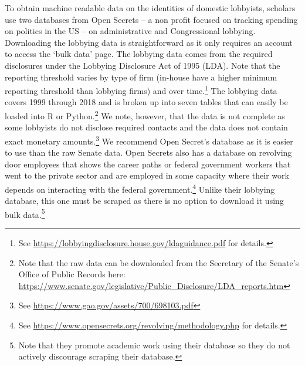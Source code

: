 \documentclass[12pt,notitlepage]{article}
\newcounter{cor}
\begin{document}
To obtain machine readable data on the identities of domestic lobbyists,
scholars use two databases from Open Secrets -- a non profit focused on
tracking spending on politics in the US -- on administrative and
Congressional lobbying. Downloading the lobbying data is straightforward
as it only requires an account to access the `bulk data' page. The
lobbying data comes from the required disclosures under the Lobbying
Disclosure Act of 1995 (LDA). Note that the reporting threshold varies
by type of firm (in-house have a higher minimum reporting threshold than
lobbying firms) and over time.\footnote{See
  \url{https://lobbyingdisclosure.house.gov/ldaguidance.pdf} for
  details.} The lobbying data covers 1999 through 2018 and is broken up
into seven tables that can easily be loaded into R or Python.\footnote{Note
  that the raw data can be downloaded from the Secretary of the Senate's
  Office of Public Records here:
  \url{https://www.senate.gov/legislative/Public_Disclosure/LDA_reports.htm}}
We note, however, that the data is not complete as some lobbyists do not
disclose required contacts and the data does not contain exact monetary
amounts.\footnote{See \url{https://www.gao.gov/assets/700/698103.pdf}}
We recommend Open Secret's database as it is easier to use than the raw
Senate data. Open Secrets also has a database on revolving door
employees that shows the career paths or federal government workers that
went to the private sector and are employed in some capacity where their
work depends on interacting with the federal government.\footnote{See
  \url{https://www.opensecrets.org/revolving/methodology.php} for
  details.} Unlike their lobbying database, this one must be scraped as
there is no option to download it using bulk data.\footnote{Note that
  they promote academic work using their database so they do not
  actively discourage scraping their database.}
\end{document}
